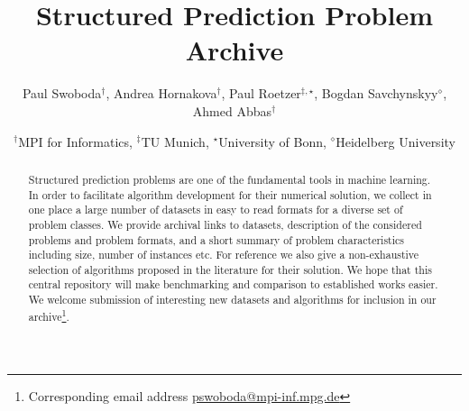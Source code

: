 \documentclass[twocolumn]{article}
\title{Structured Prediction Problem Archive}
\author{Paul Swoboda$^\dagger$, Andrea Hornakova$^\dagger$, Paul Roetzer$^{\ddagger,\star}$, Bogdan Savchynskyy$^{\diamond}$, Ahmed Abbas$^\dagger$}
\date{%
$^\dagger$MPI for Informatics, %
$^\ddagger$TU Munich, %
$^\star$University of Bonn, %
$^\diamond$Heidelberg University %
}
\begin{document}
\maketitle

\begin{abstract}
Structured prediction problems are one of the fundamental tools in machine learning.
In order to facilitate algorithm development for their numerical solution, we collect in one place a large number of datasets in easy to read formats for a diverse set of problem classes.
We provide archival links to datasets, description of the considered problems and problem formats, and a short summary of problem characteristics including size, number of instances etc.
For reference we also give a non-exhaustive selection of algorithms proposed in the literature for their solution.
We hope that this central repository will make benchmarking and comparison to established works easier.
    We welcome submission of interesting new datasets and algorithms for inclusion in our archive\footnote{Corresponding email address \href{mailto:pswoboda@mpi-inf.mpg.de}{pswoboda@mpi-inf.mpg.de}}.
\end{abstract}

\tableofcontents

\clearpage



\clearpage

\clearpage

%
\clearpage

%
\clearpage

\clearpage

\clearpage

\clearpage

\clearpage

\clearpage

\clearpage


{\small


} 

\end{document}
